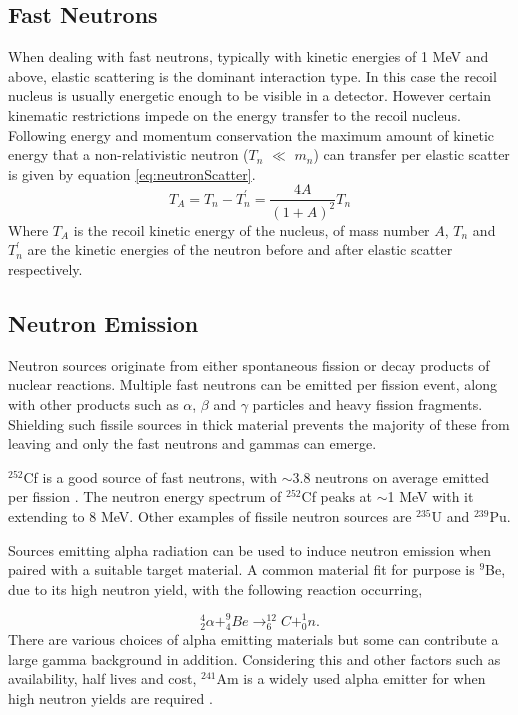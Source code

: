 \subsection{Fast Neutrons}
When dealing with fast neutrons, typically with kinetic energies of 1 MeV and above, elastic scattering is the  dominant interaction type. In this case the recoil nucleus is usually energetic enough to be visible in a detector. However certain kinematic restrictions impede on the energy transfer to the recoil nucleus. Following energy and momentum conservation the maximum amount of kinetic energy that a non-relativistic neutron ($T_{n}$ $\ll$ $m_{n}$) can transfer per elastic scatter is given by equation \ref{eq:neutronScatter}. 
\begin{equation}
	T_{A} = T_{n} - T_{n}^{'} = \frac{4A}{(1+A)^{2}}T_{n}
	\label{eq:neutronScatter}
\end{equation}
Where $T_{A}$ is the recoil kinetic energy of the nucleus, of mass number $A$, $T_{n}$ and $T_{n}^{'}$ are the kinetic energies of the neutron before and after elastic scatter respectively. 

\subsection{Neutron Emission}
Neutron sources originate from either spontaneous fission or decay products of nuclear reactions. Multiple fast neutrons can be emitted per fission event, along with other products such as $\alpha$, $\beta$ and $\gamma$ particles and heavy fission fragments. Shielding such fissile sources in thick material prevents the majority of these from leaving and only the fast neutrons and gammas can emerge. 

$^{252}$Cf is a good source of fast neutrons, with $\sim$3.8 neutrons on average emitted per fission \cite{cf252Neutrons}. The neutron energy spectrum of $^{252}$Cf peaks at $\sim$1 MeV with it extending to 8 MeV. Other examples of fissile neutron sources are $^{235}$U and $^{239}$Pu.

Sources emitting alpha radiation can be used to induce neutron emission when paired with a suitable target material. A common material fit for purpose is $^{9}$Be, due to its high neutron yield, with the following reaction occurring,

\begin{equation}
	^{4}_{2}\alpha + ^{9}_{4}Be \rightarrow ^{12}_{6}C + ^{1}_{0}n.
\end{equation}
There are various choices of alpha emitting materials but some can contribute a large gamma background in addition. Considering this and other factors such as availability, half lives and cost, $^{241}$Am is a widely used alpha emitter for when high neutron yields are required \cite{knollRadiation}. 

